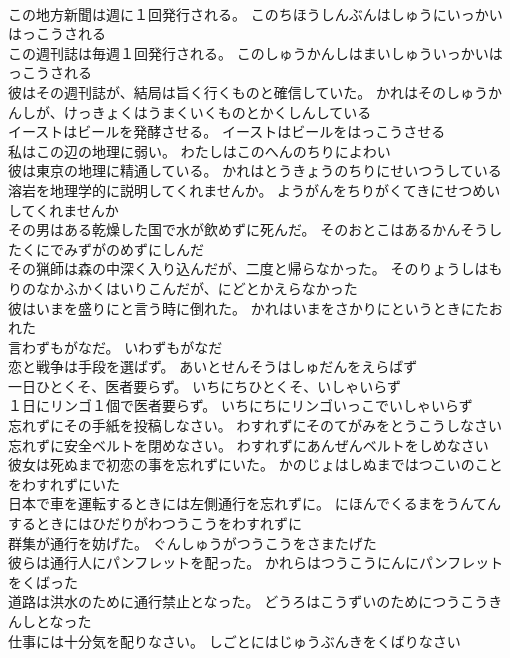 \documentclass[8pt]{extreport}
\begin{document}
\begin{CJK}{UTF8}{min}
\\	この地方新聞は週に１回発行される。	このちほうしんぶんはしゅうにいっかいはっこうされる 
\\	この週刊誌は毎週１回発行される。	このしゅうかんしはまいしゅういっかいはっこうされる 
\\	彼はその週刊誌が、結局は旨く行くものと確信していた。	かれはそのしゅうかんしが、けっきょくはうまくいくものとかくしんしている 
\\	イーストはビールを発酵させる。	イーストはビールをはっこうさせる 
\\	私はこの辺の地理に弱い。	わたしはこのへんのちりによわい 
\\	彼は東京の地理に精通している。	かれはとうきょうのちりにせいつうしている 
\\	溶岩を地理学的に説明してくれませんか。	ようがんをちりがくてきにせつめいしてくれませんか 
\\	その男はある乾燥した国で水が飲めずに死んだ。	そのおとこはあるかんそうしたくにでみずがのめずにしんだ 
\\	その猟師は森の中深く入り込んだが、二度と帰らなかった。	そのりょうしはもりのなかふかくはいりこんだが、にどとかえらなかった 
\\	彼はいまを盛りにと言う時に倒れた。	かれはいまをさかりにというときにたおれた 
\\	言わずもがなだ。	いわずもがなだ 
\\	恋と戦争は手段を選ばず。	あいとせんそうはしゅだんをえらばず 
\\	一日ひとくそ、医者要らず。	いちにちひとくそ、いしゃいらず 
\\	１日にリンゴ１個で医者要らず。	いちにちにリンゴいっこでいしゃいらず 
\\	忘れずにその手紙を投稿しなさい。	わすれずにそのてがみをとうこうしなさい 
\\	忘れずに安全ベルトを閉めなさい。	わすれずにあんぜんベルトをしめなさい 
\\	彼女は死ぬまで初恋の事を忘れずにいた。	かのじょはしぬまではつこいのことをわすれずにいた 
\\	日本で車を運転するときには左側通行を忘れずに。	にほんでくるまをうんてんするときにはひだりがわつうこうをわすれずに 
\\	群集が通行を妨げた。	ぐんしゅうがつうこうをさまたげた 
\\	彼らは通行人にパンフレットを配った。	かれらはつうこうにんにパンフレットをくばった 
\\	道路は洪水のために通行禁止となった。	どうろはこうずいのためにつうこうきんしとなった 
\\	仕事には十分気を配りなさい。	しごとにはじゅうぶんきをくばりなさい 

\end{CJK}
\end{document}

